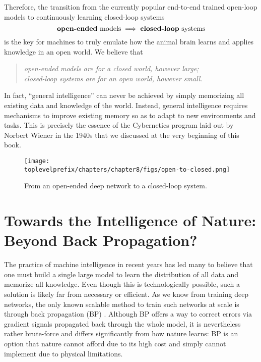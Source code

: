 \documentclass[../../book-main.tex]{subfiles}
\begin{document}
Therefore, the transition from the currently popular end-to-end trained open-loop models to continuously learning closed-loop systems
\begin{equation}
   \text{\textbf{open-ended} models} \; \Longrightarrow \; 
   \text{\textbf{closed-loop} systems}
\end{equation}
is the key for machines to truly emulate how the animal brain learns and applies knowledge in an open world. We believe that
\begin{quote}
\begin{center}
        \textit{open-ended models are for a closed world, however large; \\ closed-loop systems are for an open world, however small.}
\end{center}
\end{quote}
In fact, ``general intelligence'' can never be achieved by simply memorizing all existing data and knowledge of the world. Instead, general intelligence requires mechanisms to improve existing memory so as to adapt to new environments and tasks. This is precisely the essence of the Cybernetics program laid out by Norbert Wiener in the 1940s that we discussed at the very beginning of this book.

\begin{figure}[t]
    \centering    
    \texttt{[image: \\toplevelprefix/chapters/chapter8/figs/open-to-closed.png]}
    \caption{From an open-ended deep network to a closed-loop system.}
    \label{fig:open-to-closed}
\end{figure}



\section{Towards the Intelligence of Nature: Beyond Back Propagation?}
The practice of machine intelligence in recent years has led many to believe that one must build a single large model to learn the distribution of all data and memorize all knowledge. Even though this is technologically possible, such a solution is likely far from necessary or efficient. As we know from training deep networks, the only known scalable method to train such networks at scale is through back propagation (BP) \cite{Back-Prop}. Although BP offers a way to correct errors via gradient signals propagated back through the whole model, it is nevertheless rather brute-force and differs significantly from how nature learns: BP is an option that nature cannot afford due to its high cost and simply cannot implement due to physical limitations.
\end{document}
